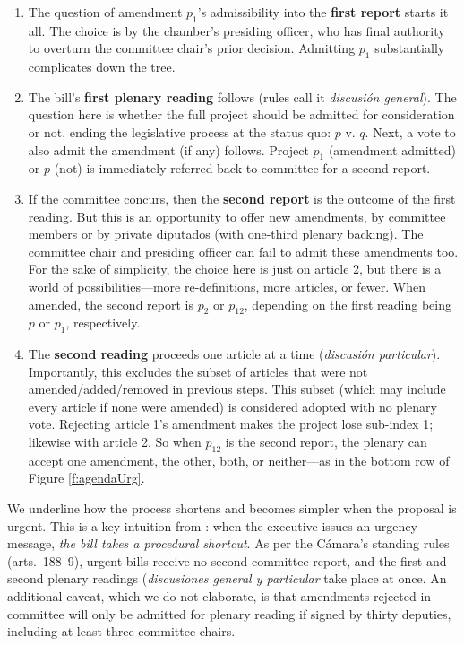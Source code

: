 \documentclass[letter,12pt]{article}
\begin{document}
\begin{enumerate}
\item The question of amendment $p_1$'s admissibility into the \textbf{first report} starts it all. The choice is by the chamber's presiding officer, who has final authority to overturn the committee chair's prior decision. Admitting $p_1$ substantially complicates down the tree. 
\item The bill's \textbf{first plenary reading} follows (rules call it \emph{discusión general}). The question here is whether the full project should be admitted for consideration or not, ending the legislative process at the status quo: $p$ v. $q$. Next, a vote to also admit the amendment (if any) follows. Project $p_1$ (amendment admitted) or $p$ (not) is immediately referred back to committee for a second report. 
\item If the committee concurs, then the \textbf{second report} is the outcome of the first reading. But this is an opportunity to offer new amendments, by committee members or by private diputados (with one-third plenary backing). The committee chair and presiding officer can fail to admit these amendments too. For the sake of simplicity, the choice here is just on article 2, but there is a world of possibilities---more re-definitions, more articles, or fewer. When amended, the second report is $p_2$ or $p_{12}$, depending on the first reading being $p$ or $p_1$, respectively. 
\item The \textbf{second reading} proceeds one article at a time (\emph{discusión particular}). Importantly, this excludes the subset of articles that were not amended/added/removed in previous steps. This subset (which may include every article if none were amended) is considered adopted with no plenary vote. Rejecting article 1's amendment makes the project lose sub-index 1; likewise with article 2. So when $p_{12}$ is the second report, the plenary can accept one amendment, the other, both, or neither---as in the bottom row of Figure \ref{f:agendaUrg}. 
\end{enumerate}


We underline how the process shortens and becomes simpler when the proposal is urgent. This is a key intuition from \citet{sotoCongChile2015}: when the executive issues an urgency message, \emph{the bill takes a procedural shortcut}. As per the Cámara's standing rules (arts.~188--9), urgent bills receive no second committee report, and the first and second plenary readings (\emph{discusiones general y particular} take place at once. An additional caveat, which we do not elaborate, is that amendments rejected in committee will only be admitted for plenary reading if signed by thirty deputies, including at least three committee chairs.
\end{document}
